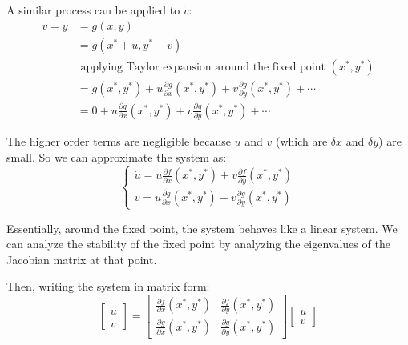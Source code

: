 A similar process can be applied to $\dot{v}$:
\begin{align*}
\dot{v} = \dot{y} &= g(x, y) \\
&= g(x^{*} + u, y^{*} + v) \\
&\text{ applying Taylor expansion around the fixed point } (x^{*}, y^{*}) \\
&= g(x^{*}, y^{*}) + u \frac{\partial g}{\partial x} (x^{*}, y^{*}) + v \frac{\partial g}{\partial y} (x^{*}, y^{*}) + \cdots \\
&= 0 + u \frac{\partial g}{\partial x} (x^{*}, y^{*}) + v \frac{\partial g}{\partial y} (x^{*}, y^{*}) + \cdots
\end{align*}

The higher order terms are negligible because $u$ and $v$ (which are $\delta x$ and $\delta y$) are small. So we can approximate the system as:
\begin{equation*}
\begin{cases}
\dot{u} = u \frac{\partial f}{\partial x} (x^{*}, y^{*}) + v \frac{\partial f}{\partial y} (x^{*}, y^{*}) \\
\dot{v} = u \frac{\partial g}{\partial x} (x^{*}, y^{*}) + v \frac{\partial g}{\partial y} (x^{*}, y^{*})
\end{cases}
\end{equation*}

Essentially, around the fixed point, the system behaves like a linear system. We can analyze the stability of the fixed point by analyzing the eigenvalues of the Jacobian matrix at that point.

Then, writing the system in matrix form:
\begin{equation*}
\begin{bmatrix}
\dot{u} \\
\dot{v}
\end{bmatrix}
=
\begin{bmatrix}
\frac{\partial f}{\partial x} (x^{*}, y^{*}) & \frac{\partial f}{\partial y} (x^{*}, y^{*}) \\
\frac{\partial g}{\partial x} (x^{*}, y^{*})
& \frac{\partial g}{\partial y} (x^{*}, y^{*})
\end{bmatrix}
\begin{bmatrix}
u \\
v
\end{bmatrix}
\end{equation*}


